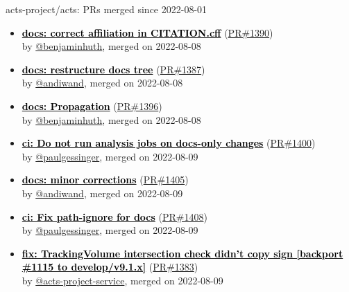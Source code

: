 \begin{frame}[allowframebreaks]{ acts-project/acts: PRs merged since 2022-08-01 }
\begin{itemize}
    \item
    \textbf{\href{https://github.com/acts-project/acts/pull/1390}{\textcolor{black}{docs: correct affiliation in CITATION.cff}}}
    (\href{https://github.com/acts-project/acts/pull/1390}{PR\#1390}) \\
    by \href{https://github.com/benjaminhuth}{ @benjaminhuth}, merged on 2022-08-08

    \item
    \textbf{\href{https://github.com/acts-project/acts/pull/1387}{\textcolor{black}{docs: restructure docs tree}}}
    (\href{https://github.com/acts-project/acts/pull/1387}{PR\#1387}) \\
    by \href{https://github.com/andiwand}{ @andiwand}, merged on 2022-08-08

    \item
    \textbf{\href{https://github.com/acts-project/acts/pull/1396}{\textcolor{black}{docs: Propagation}}}
    (\href{https://github.com/acts-project/acts/pull/1396}{PR\#1396}) \\
    by \href{https://github.com/benjaminhuth}{ @benjaminhuth}, merged on 2022-08-08

    \item
    \textbf{\href{https://github.com/acts-project/acts/pull/1400}{\textcolor{black}{ci: Do not run analysis jobs on docs-only changes}}}
    (\href{https://github.com/acts-project/acts/pull/1400}{PR\#1400}) \\
    by \href{https://github.com/paulgessinger}{ @paulgessinger}, merged on 2022-08-09

    \item
    \textbf{\href{https://github.com/acts-project/acts/pull/1405}{\textcolor{black}{docs: minor corrections}}}
    (\href{https://github.com/acts-project/acts/pull/1405}{PR\#1405}) \\
    by \href{https://github.com/andiwand}{ @andiwand}, merged on 2022-08-09

    \item
    \textbf{\href{https://github.com/acts-project/acts/pull/1408}{\textcolor{black}{ci: Fix path-ignore for docs}}}
    (\href{https://github.com/acts-project/acts/pull/1408}{PR\#1408}) \\
    by \href{https://github.com/paulgessinger}{ @paulgessinger}, merged on 2022-08-09

    \item
    \textbf{\href{https://github.com/acts-project/acts/pull/1383}{\textcolor{black}{fix: TrackingVolume intersection check didn't copy sign [backport \#1115 to develop/v9.1.x]}}}
    (\href{https://github.com/acts-project/acts/pull/1383}{PR\#1383}) \\
    by \href{https://github.com/acts-project-service}{ @acts-project-service}, merged on 2022-08-09


\end{itemize}
\end{frame}
